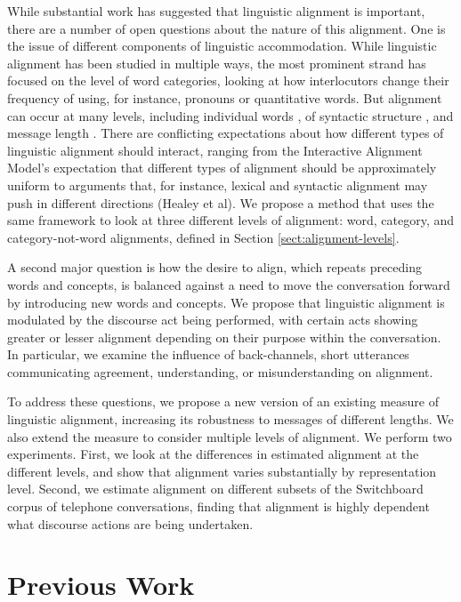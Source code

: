 \documentclass[11pt]{article}
\begin{document}
While substantial work has suggested that linguistic alignment is important, there are a number of open questions about the nature of this alignment. One is the issue of different components of linguistic accommodation. While linguistic alignment has been studied in multiple ways, the most prominent strand has focused on the level of word categories, looking at how interlocutors change their frequency of using, for instance, pronouns or quantitative words. But alignment can occur at many levels, including individual words \cite{FusaroliEtAl2012?}, of syntactic structure \cite{HealeyPurverHowes2014}, and message length \cite{?}.  There are conflicting expectations about how different types of linguistic alignment should interact, ranging from the Interactive Alignment Model's expectation that different types of alignment should be approximately uniform \cite{PickeringGarrod2004} to arguments that, for instance, lexical and syntactic alignment may push in different directions (Healey et al).  We propose a method that uses the same framework to look at three different levels of alignment: word, category, and category-not-word alignments, defined in Section \ref{sect:alignment-levels}.

A second major question is how the desire to align, which repeats preceding words and concepts, is balanced against a need to move the conversation forward by introducing new words and concepts.  We propose that linguistic alignment is modulated by the discourse act being performed, with certain acts showing greater or lesser alignment depending on their purpose within the conversation.  In particular, we examine the influence of back-channels, short utterances communicating agreement, understanding, or misunderstanding on alignment.

To address these questions, we propose a new version of an existing measure of linguistic alignment, increasing its robustness to messages of different lengths.  We also extend the measure to consider multiple levels of alignment.  We perform two experiments. First, we look at the differences in estimated alignment at the different levels, and show that alignment varies substantially by representation level.  Second, we estimate alignment on different subsets of the Switchboard corpus of telephone conversations, finding that alignment is highly dependent what discourse actions are being undertaken.

\section{Previous Work}
\end{document}
